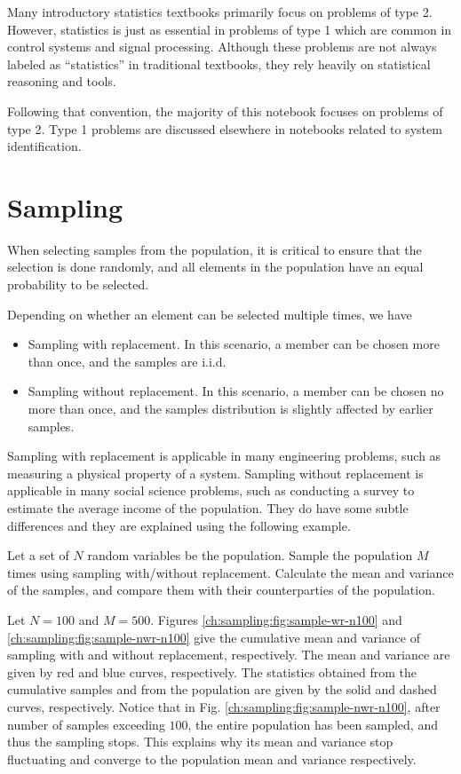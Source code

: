 Many introductory statistics textbooks primarily focus on problems of type 2. However, statistics is just as essential in problems of type 1 which are common in control systems and signal processing. Although these problems are not always labeled as ``statistics'' in traditional textbooks, they rely heavily on statistical reasoning and tools. 

Following that convention, the majority of this notebook focuses on problems of type 2. Type 1 problems are discussed elsewhere in notebooks related to system identification.

\section{Sampling}

When selecting samples from the population, it is critical to ensure that the selection is done randomly, and all elements in the population have an equal probability to be selected. 

Depending on whether an element can be selected multiple times, we have
\begin{itemize}
  \item Sampling with replacement. In this scenario, a member can be chosen more than once, and the samples are i.i.d.
  \item Sampling without replacement. In this scenario, a member can be chosen no more than once, and the samples distribution is slightly affected by earlier samples.
\end{itemize}
Sampling with replacement is applicable in many engineering problems, such as measuring a physical property of a system. Sampling without replacement is applicable in many social science problems, such as conducting a survey to estimate the average income of the population. They do have some subtle differences and they are explained using the following example.

Let a set of $N$ random variables be the population. Sample the population $M$ times using sampling with/without replacement. Calculate the mean and variance of the samples, and compare them with their counterparties of the population.

Let $N=100$ and $M=500$. Figures \ref{ch:sampling:fig:sample-wr-n100} and \ref{ch:sampling:fig:sample-nwr-n100} give the cumulative mean and variance of sampling with and without replacement, respectively. The mean and variance are given by red and blue curves, respectively. The statistics obtained from the cumulative samples and from the population are given by the solid and dashed curves, respectively. Notice that in Fig. \ref{ch:sampling:fig:sample-nwr-n100}, after number of samples exceeding $100$, the entire population has been sampled, and thus the sampling stops. This explains why its mean and variance stop fluctuating and converge to the population mean and variance respectively.

